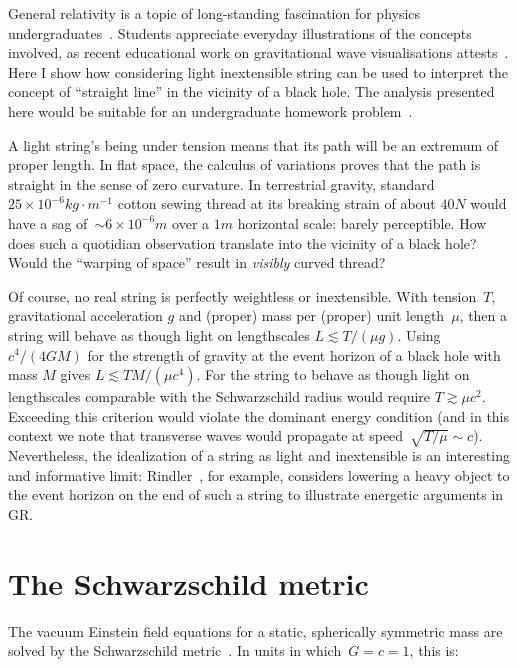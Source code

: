 \documentclass{ws-tpe}
\begin{document}
General relativity is a topic of long-standing fascination for physics
undergraduates~\cite{christensen2012}.  Students appreciate everyday
illustrations of the concepts involved, as recent educational work on
gravitational wave visualisations attests~\cite{overduin2018}.  Here I
show how considering light inextensible string can be used to
interpret the concept of ``straight line'' in the vicinity of a black
hole.  The analysis presented here would be suitable for an
undergraduate homework problem~\cite{romano2019}.

A light string's being under tension means that its path will be an
extremum of proper length.  In flat space, the calculus of variations
proves that the path is straight in the sense of zero curvature.  In
terrestrial gravity, standard $25\times
10^{-6}\unit{kg}\cdot\unit{m}^{-1}$ cotton sewing thread at its
breaking strain of about $40\unit{N}$ would have a sag of~${\sim}
6\times 10^{-6}\unit{m}$ over a $1\unit{m}$ horizontal scale: barely
perceptible.  How does such a quotidian observation translate into the
vicinity of a black hole?  Would the ``warping of space'' result in
{\em visibly} curved thread?

Of course, no real string is perfectly weightless or inextensible.
With tension~$T$, gravitational acceleration $g$ and (proper) mass per
(proper) unit length~$\mu$, then a string will behave as though light
on lengthscales $L\lesssim T/\left(\mu g\right)$.  Using
$c^4/\left(4GM\right)$ for the strength of gravity at the event
horizon of a black hole with mass $M$ gives $L\lesssim TM/\left(\mu
c^4\right)$.  For the string to behave as though light on lengthscales
comparable with the Schwarzschild radius would require $T\gtrsim\mu
c^2$.  Exceeding this criterion would violate the dominant energy
condition (and in this context we note that transverse waves would
propagate at speed~$\sqrt{T/\mu}\sim c$).  Nevertheless, the
idealization of a string as light and inextensible is an interesting
and informative limit: Rindler~\cite{rindler}, for example, considers
lowering a heavy object to the event horizon on the end of such a
string to illustrate energetic arguments in GR.

\section{The Schwarzschild metric}

The vacuum Einstein field equations for a static, spherically
symmetric mass are solved by the Schwarzschild
metric~\cite{schwarzschild1916}.  In units in which~$G=c=1$, this is:
\end{document}
